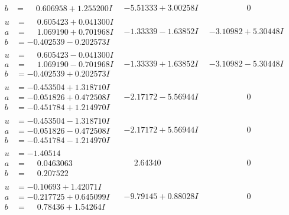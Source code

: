 \documentclass[1p]{elsarticle_modified}
\theoremstyle{definition}
\begin{document}
$$\begin{array}{c|c|c}
\begin{aligned}
b &= \phantom{-}0.606958 + 1.255200 I\end{aligned}
 & -5.51333 + 3.00258 I & \phantom{-0.000000 } 0 \\ \hline\begin{aligned}
u &= \phantom{-}0.605423 + 0.041300 I \\
a &= \phantom{-}1.069190 + 0.701968 I \\
b &= -0.402539 - 0.202573 I\end{aligned}
 & -1.33339 - 1.63852 I & -3.10982 + 5.30448 I \\ \hline\begin{aligned}
u &= \phantom{-}0.605423 - 0.041300 I \\
a &= \phantom{-}1.069190 - 0.701968 I \\
b &= -0.402539 + 0.202573 I\end{aligned}
 & -1.33339 + 1.63852 I & -3.10982 - 5.30448 I \\ \hline\begin{aligned}
u &= -0.453504 + 1.318710 I \\
a &= -0.051826 + 0.472508 I \\
b &= -0.451784 + 1.214970 I\end{aligned}
 & -2.17172 - 5.56944 I & \phantom{-0.000000 } 0 \\ \hline\begin{aligned}
u &= -0.453504 - 1.318710 I \\
a &= -0.051826 - 0.472508 I \\
b &= -0.451784 - 1.214970 I\end{aligned}
 & -2.17172 + 5.56944 I & \phantom{-0.000000 } 0 \\ \hline\begin{aligned}
u &= -1.40514\phantom{ +0.000000I} \\
a &= \phantom{-}0.0463063\phantom{ +0.000000I} \\
b &= \phantom{-}0.207522\phantom{ +0.000000I}\end{aligned}
 & \phantom{-}2.64340\phantom{ +0.000000I} & \phantom{-0.000000 } 0 \\ \hline\begin{aligned}
u &= -0.10693 + 1.42071 I \\
a &= -0.217725 + 0.645099 I \\
b &= \phantom{-}0.78436 + 1.54264 I\end{aligned}
 & -9.79145 + 0.88028 I & \phantom{-0.000000 } 0 \\ \hline\begin{aligned}

\end{aligned}
\end{array}$$
\end{document}
